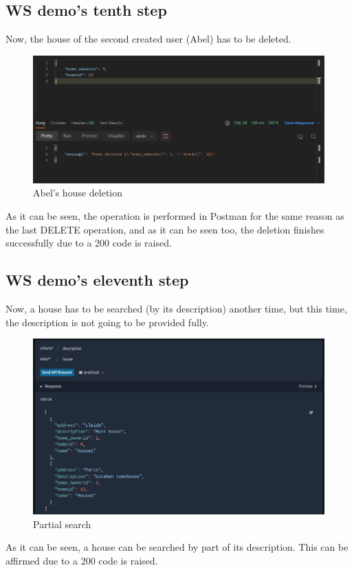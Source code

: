 \documentclass[a4paper,12pt]{article}
\begin{document}
\subsection*{WS demo's tenth step}
Now, the house of the second created user (Abel) has to be deleted.
\begin{figure}[H]
    \centering
    \includegraphics[scale = 0.5]{images/Abel house deleted.png}
    \caption{Abel's house deletion}
    \label{fig:abelD}
\end{figure}
As it can be seen, the operation is performed in Postman for the same reason as the last DELETE operation, and as it can be seen too, the deletion finishes successfully due to a 200 code is raised.
\subsection*{WS demo's eleventh step}
Now, a house has to be searched (by its description) another time, but this time, the description is not going to be provided fully.
\begin{figure}[H]
    \centering
    \includegraphics[scale = 0.5]{images/Partial search.png}
    \caption{Partial search}
    \label{fig:partial}
\end{figure}
As it can be seen, a house can be searched by part of its description. This can be affirmed due to a 200 code is raised.
\end{document}

